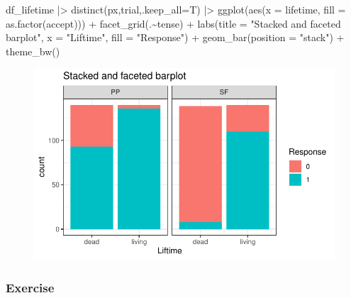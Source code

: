 \documentclass[
  letterpaper,
  DIV=11,
  numbers=noendperiod]{scrartcl}
\newenvironment{Shaded}{\begin{snugshade}}{\end{snugshade}}
\newcommand{\AttributeTok}[1]{\textcolor[rgb]{0.40,0.45,0.13}{#1}}
\newcommand{\FunctionTok}[1]{\textcolor[rgb]{0.28,0.35,0.67}{#1}}
\newcommand{\NormalTok}[1]{\textcolor[rgb]{0.00,0.23,0.31}{#1}}
\newcommand{\SpecialCharTok}[1]{\textcolor[rgb]{0.37,0.37,0.37}{#1}}
\newcommand{\StringTok}[1]{\textcolor[rgb]{0.13,0.47,0.30}{#1}}
\begin{document}
\begin{Shaded}
\begin{Highlighting}[numbers=left,,]
\NormalTok{df\_lifetime }\SpecialCharTok{|\textgreater{}} 
  \FunctionTok{distinct}\NormalTok{(px,trial,}\AttributeTok{.keep\_all=}\NormalTok{T) }\SpecialCharTok{|\textgreater{}} 
  \FunctionTok{ggplot}\NormalTok{(}\FunctionTok{aes}\NormalTok{(}\AttributeTok{x =}\NormalTok{ lifetime, }\AttributeTok{fill =} \FunctionTok{as.factor}\NormalTok{(accept))) }\SpecialCharTok{+}
  \FunctionTok{facet\_grid}\NormalTok{(.}\SpecialCharTok{\textasciitilde{}}\NormalTok{tense) }\SpecialCharTok{+}
  \FunctionTok{labs}\NormalTok{(}\AttributeTok{title =} \StringTok{"Stacked and faceted barplot"}\NormalTok{,}
       \AttributeTok{x =} \StringTok{"Liftime"}\NormalTok{,}
       \AttributeTok{fill =} \StringTok{"Response"}\NormalTok{) }\SpecialCharTok{+}
  \FunctionTok{geom\_bar}\NormalTok{(}\AttributeTok{position =} \StringTok{"stack"}\NormalTok{) }\SpecialCharTok{+}
  \FunctionTok{theme\_bw}\NormalTok{()}
\end{Highlighting}
\end{Shaded}

\begin{figure}[H]

{\centering \includegraphics{_data_viz_files/figure-pdf/unnamed-chunk-41-1.pdf}

}

\end{figure}

\hypertarget{exercise-5}{%
\subsubsection{Exercise}\label{exercise-5}}
\end{document}
